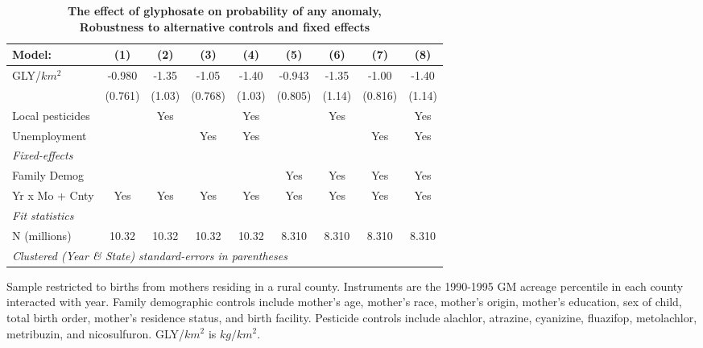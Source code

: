 \begin{table}[htbp]
   \centering
   \small
   \begin{threeparttable}[b]
      \caption{\label{tab:robust-cntrl-any_anomaly-percentilegmacres} \textbf{The effect of glyphosate on probability of any anomaly, \\ Robustness to alternative controls and fixed effects}}
      \begin{tabular}{lcccccccc}
         \toprule
         Model:           & (1)     & (2)    & (3)     & (4)    & (5)     & (6)    & (7)     & (8)\\  
         \midrule 
         GLY/$km^2$       & -0.980  & -1.35  & -1.05   & -1.40  & -0.943  & -1.35  & -1.00   & -1.40\\   
                          & (0.761) & (1.03) & (0.768) & (1.03) & (0.805) & (1.14) & (0.816) & (1.14)\\   
         Local pesticides &         & Yes    &         & Yes    &         & Yes    &         & Yes\\  
         Unemployment     &         &        & Yes     & Yes    &         &        & Yes     & Yes\\  
         \midrule
         \emph{Fixed-effects}\\
         Family Demog     &         &        &         &        & Yes     & Yes    & Yes     & Yes\\  
         Yr x Mo + Cnty   & Yes     & Yes    & Yes     & Yes    & Yes     & Yes    & Yes     & Yes\\  
         \midrule
         \emph{Fit statistics}\\
         N (millions)     & 10.32   & 10.32  & 10.32   & 10.32  & 8.310   & 8.310  & 8.310   & 8.310\\  
         \midrule
         \multicolumn{9}{l}{\emph{Clustered (Year \& State) standard-errors in parentheses}}\\
      \end{tabular}
      
      \begin{tablenotes}\item Sample restricted to births from mothers residing in a rural county. Instruments are the 1990-1995 GM acreage percentile in each county interacted with year. Family demographic controls include mother's age, mother's race, mother's origin, mother's education, sex of child, total birth order, mother's residence status, and birth facility. Pesticide controls include alachlor, atrazine, cyanizine, fluazifop, metolachlor, metribuzin, and nicosulfuron. GLY/$km^2$ is $kg/km^2$.
      \end{tablenotes}
   \end{threeparttable}
\end{table}
